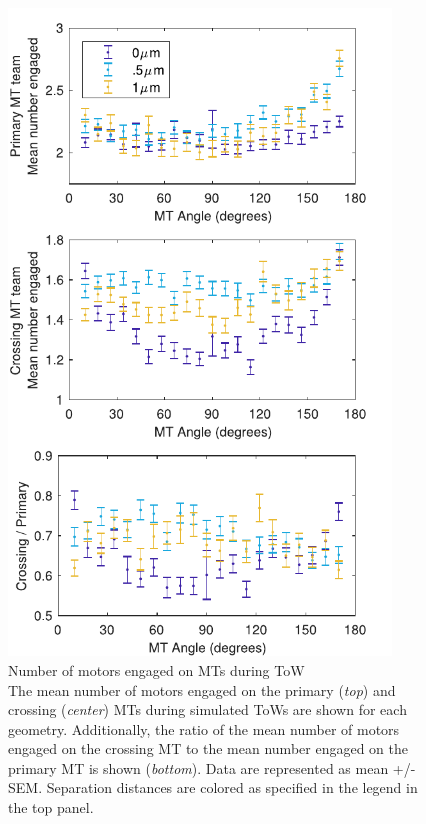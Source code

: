 \begin{figure}
\centering
\includegraphics[width=4in]{appendix1/num_engagedEXP.pdf}
\caption[Number of motors engaged on MTs during ToW]{ Number of motors engaged on MTs during ToW\\
The mean number of motors engaged on the primary (\textit{top}) and crossing (\textit{center}) MTs during simulated ToWs are shown for each geometry. Additionally, the ratio of the mean number of motors engaged on the crossing MT to the mean number engaged on the primary MT is shown (\textit{bottom}). Data are represented as mean +/- SEM. Separation distances are colored as specified in the legend in the top panel.
} \label{fig:num_engagedEXP}
\end{figure}

\clearpage


